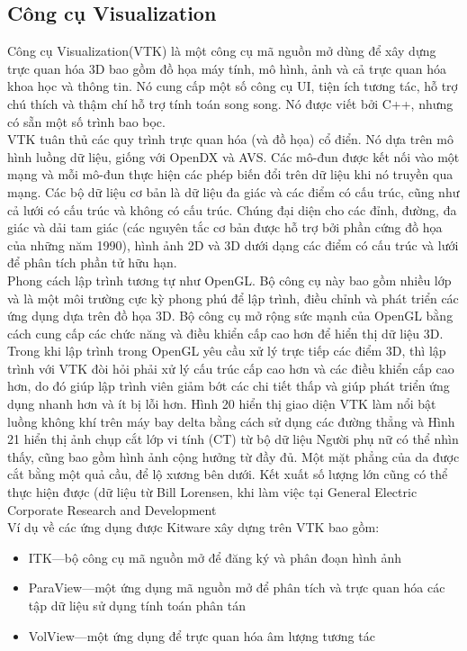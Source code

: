\documentclass[13pt]{scrartcl} %
\begin{document}
\subsection{Công cụ Visualization}
Công cụ Visualization(VTK) là một công cụ mã nguồn mở dùng để xây dựng trực quan hóa 3D bao gồm đồ họa máy tính, mô hình, ảnh và cả trực quan hóa khoa học và thông tin. Nó cung cấp một số công cụ UI, tiện ích tương tác, hỗ trợ chú thích và thậm chí hỗ trợ tính toán song song. Nó được viết bởi C++, nhưng có sẵn một số trình bao bọc. \\
VTK tuân thủ các quy trình trực quan hóa (và đồ họa) cổ điển. Nó dựa trên mô hình luồng dữ liệu, giống với OpenDX và AVS. Các mô-đun được kết nối vào một mạng và mỗi mô-đun thực hiện các phép biến đổi trên dữ liệu khi nó truyền qua mạng. Các bộ dữ liệu cơ bản là dữ liệu đa giác và các điểm có cấu trúc, cũng như cả lưới có cấu trúc và không có cấu trúc. Chúng đại diện cho các đỉnh, đường, đa giác và dải tam giác (các nguyên tắc cơ bản được hỗ trợ bởi phần cứng đồ họa của những năm 1990), hình ảnh 2D và 3D dưới dạng các điểm có cấu trúc và lưới để phân tích phần tử hữu hạn.\\
Phong cách lập trình tương tự như OpenGL. Bộ công cụ này bao gồm nhiều lớp và là một môi trường cực kỳ phong phú để lập trình, điều chỉnh và phát triển các ứng dụng dựa trên đồ họa 3D. Bộ công cụ mở rộng sức mạnh của OpenGL bằng cách cung cấp các chức năng và điều khiển cấp cao hơn để hiển thị dữ liệu 3D. Trong khi lập trình trong OpenGL yêu cầu xử lý trực tiếp các điểm 3D, thì lập trình với VTK đòi hỏi phải xử lý cấu trúc cấp cao hơn và các điều khiển cấp cao hơn, do đó giúp lập trình viên giảm bớt các chi tiết thấp và giúp phát triển ứng dụng nhanh hơn và ít bị lỗi hơn. Hình 20 hiển thị giao diện VTK làm nổi bật luồng không khí trên máy bay delta bằng cách sử dụng các đường thẳng và Hình 21 hiển thị ảnh chụp cắt lớp vi tính (CT) từ bộ dữ liệu Người phụ nữ có thể nhìn thấy, cũng bao gồm hình ảnh cộng hưởng từ đầy đủ. Một mặt phẳng của da được cắt bằng một quả cầu, để lộ xương bên dưới. Kết xuất số lượng lớn cũng có thể thực hiện được (dữ liệu từ Bill Lorensen, khi làm việc tại General Electric Corporate Research and Development\\
Ví dụ về các ứng dụng được Kitware xây dựng trên VTK bao gồm:

\begin{itemize}
    \item ITK—bộ công cụ mã nguồn mở để đăng ký và phân đoạn hình ảnh
    \item ParaView—một ứng dụng mã nguồn mở để phân tích và trực quan hóa các tập dữ liệu sử dụng tính toán phân tán
    \item VolView—một ứng dụng để trực quan hóa âm lượng tương tác
\end{itemize}
\end{document}

